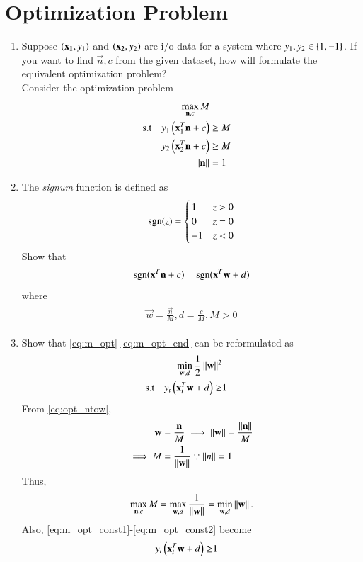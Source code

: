 \documentclass[journal,12pt,twocolumn]{IEEEtran}
\renewcommand\thesection{\arabic{section}}
\begin{document}
\section{Optimization Problem}
\begin{enumerate}[label=\thesection.\arabic*,ref=\thesection.\theenumi]

\item Suppose $\left(\mathbf{x_1},y_1\right)$ and $\left(\mathbf{x_2},y_2\right)$  are i/o data for a system where $y_1, y_2 \in 
\left\{1,-1\right\}$. If you want 
to find $\vec{n},c$ from the given dataset, how will formulate the equivalent 
optimization 
problem?
\\
\solution
 Consider the optimization problem
\begin{align}
\label{eq:m_opt}
\max_{\mathbf{n},c}M
\\
\label{eq:m_opt_const1}
\text{s.t} \quad y_1\left(\mathbf{x}_1^T\mathbf{n}+c\right) &\ge M
\\
\label{eq:m_opt_const2}
y_2\left(\mathbf{x}_2^T\mathbf{n}+c\right) &\ge M
\\
\left\Vert\mathbf{n}\right\Vert &= 1
\label{eq:m_opt_end}
\end{align}
\item The {\em signum} function is defined as
\begin{align}
\mathop{\mathrm{sgn}}(z) = 
\begin{cases}
1  & z > 0
\\
0  & z = 0
\\
-1  & z < 0
\end{cases}
\end{align}
Show that
%
\begin{align}
\mathop{\mathrm{sgn}}(\mathbf{x}^T\mathbf{n}+c) = \mathop{\mathrm{sgn}}(\mathbf{x}^T\mathbf{w}+d)
\end{align}
%
where
\begin{align}
\begin{split}
\vec{w} = \frac{\vec{n}}{M}, 
d = \frac{c}{M}, M >0
\end{split}
\label{eq:opt_ntow}
\end{align}

\item Show that \eqref{eq:m_opt}-\eqref{eq:m_opt_end} can be reformulated as
%
\begin{align}
\label{eq:opt_w}
\min_{\mathbf{w},d}\frac{1}{2}\left\Vert\mathbf{w}\right\Vert^2
\\
\text{s.t} \quad  y_i\left(\mathbf{x}_i^T\mathbf{w}+d\right) \ge&1
\end{align}
\solution From \eqref{eq:opt_ntow},
\begin{align}
\mathbf{w} &= \frac{\mathbf{n}}{M} \implies 
 \left\Vert\mathbf{w}\right\Vert = \frac{\left\Vert\mathbf{n}\right\Vert}{M} 
\\
\implies M &= \frac{1}{\left\Vert\mathbf{w}\right\Vert} \because \left\Vert n\right\Vert = 1
\end{align}
Thus, 
\begin{align}
\max_{\mathbf{n},c}M = \max_{\mathbf{w},d}\frac{1}{\left\Vert\mathbf{w}\right\Vert}=\min_{\mathbf{w},d}\left\Vert\mathbf{w}\right\Vert.
\end{align}
Also, \eqref{eq:m_opt_const1}-\eqref{eq:m_opt_const2} become
\begin{align}
y_i\left(\mathbf{x}_i^T\mathbf{w}+d\right) \ge&1
\end{align}
%
\end{enumerate}
\end{document}
